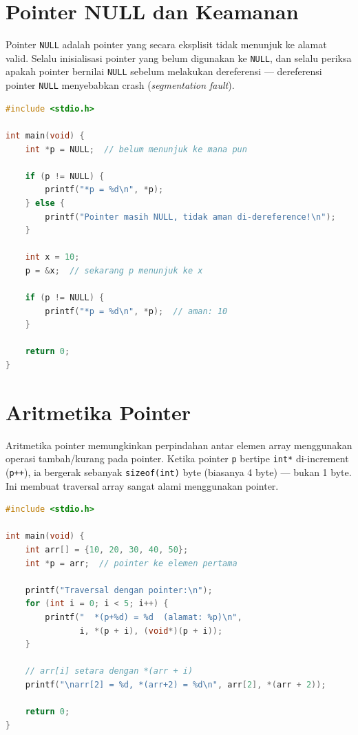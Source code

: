 \documentclass[../main.tex]{subfiles}
\begin{document}
\section{Pointer NULL dan Keamanan}

Pointer \texttt{NULL} adalah pointer yang secara eksplisit tidak menunjuk ke alamat valid. Selalu inisialisasi pointer yang belum digunakan ke \texttt{NULL}, dan selalu periksa apakah pointer bernilai \texttt{NULL} sebelum melakukan dereferensi --- dereferensi pointer \texttt{NULL} menyebabkan crash (\textit{segmentation fault}).

\begin{lstlisting}[language=C,caption=Pointer NULL dan pengecekan]
#include <stdio.h>

int main(void) {
    int *p = NULL;  // belum menunjuk ke mana pun
    
    if (p != NULL) {
        printf("*p = %d\n", *p);
    } else {
        printf("Pointer masih NULL, tidak aman di-dereference!\n");
    }
    
    int x = 10;
    p = &x;  // sekarang p menunjuk ke x
    
    if (p != NULL) {
        printf("*p = %d\n", *p);  // aman: 10
    }
    
    return 0;
}
\end{lstlisting}

\section{Aritmetika Pointer}

Aritmetika pointer memungkinkan perpindahan antar elemen array menggunakan operasi tambah/kurang pada pointer. Ketika pointer \texttt{p} bertipe \texttt{int*} di-increment (\texttt{p++}), ia bergerak sebanyak \texttt{sizeof(int)} byte (biasanya 4 byte) --- bukan 1 byte. Ini membuat traversal array sangat alami menggunakan pointer.

\begin{lstlisting}[language=C,caption=Aritmetika pointer dan traversal array]
#include <stdio.h>

int main(void) {
    int arr[] = {10, 20, 30, 40, 50};
    int *p = arr;  // pointer ke elemen pertama
    
    printf("Traversal dengan pointer:\n");
    for (int i = 0; i < 5; i++) {
        printf("  *(p+%d) = %d  (alamat: %p)\n",
               i, *(p + i), (void*)(p + i));
    }
    
    // arr[i] setara dengan *(arr + i)
    printf("\narr[2] = %d, *(arr+2) = %d\n", arr[2], *(arr + 2));
    
    return 0;
}
\end{lstlisting}
\end{document}
